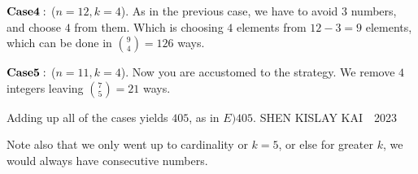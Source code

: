 \begin{enumerate}
 $\bold{Case 4}:$ ($n=12, k=4$). As in the previous case, we have to avoid $3$ numbers, and choose $4$ from them. Which is choosing $4$ elements from $12-3=9$ elements, which can be done in $\binom{9}{4}=126$ ways.

 $\bold{Case 5}:$ ($n=11, k=4$). Now you are accustomed to the strategy. We remove $4$ integers leaving $\binom{7}{5}=21$ ways.

 Adding up all of the cases yields $405$, as in $\boxed{E)405}$. SHEN KISLAY KAI~~2023

 Note also that we only went up to cardinality or $k=5$, or else for greater $k$, we would always have consecutive numbers.

 


\end{enumerate}
